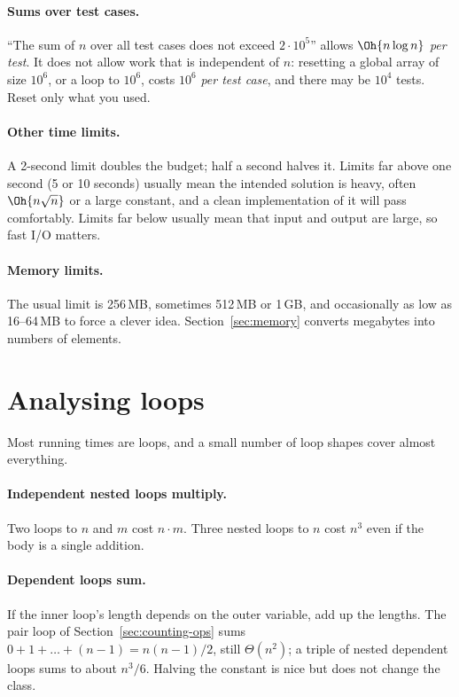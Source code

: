 \paragraph{Sums over test cases.} ``The sum of $n$ over all test cases does not exceed $2\cdot10^5$'' allows
$\Oh{n\log n}$ \emph{per test}. It does not allow work that is independent of $n$: resetting a global array of size $10^6$,
or a loop to $10^6$, costs $10^6$ \emph{per test case}, and there may be $10^4$ tests. Reset only what you used.

\paragraph{Other time limits.} A 2-second limit doubles the budget; half a second halves it. Limits far above one second
(5 or 10 seconds) usually mean the intended solution is heavy, often $\Oh{n\sqrt n}$ or a large constant, and a clean
implementation of it will pass comfortably. Limits far below usually mean that input and output are large, so fast I/O
matters.

\paragraph{Memory limits.} The usual limit is 256\,MB, sometimes 512\,MB or 1\,GB, and occasionally as low as 16--64\,MB to
force a clever idea. Section~\ref{sec:memory} converts megabytes into numbers of elements.

\section[Analysing loops]{Analysing loops \hfill \silver}\label{sec:loops}

Most running times are loops, and a small number of loop shapes cover almost everything.

\paragraph{Independent nested loops multiply.} Two loops to $n$ and $m$ cost $n \cdot m$. Three nested loops to $n$ cost
$n^3$ even if the body is a single addition.

\paragraph{Dependent loops sum.} If the inner loop's length depends on the outer variable, add up the lengths. The pair loop
of Section~\ref{sec:counting-ops} sums $0 + 1 + \dots + (n-1) = n(n-1)/2$, still $\Theta(n^2)$; a triple of nested dependent
loops sums to about $n^3 / 6$. Halving the constant is nice but does not change the class.

